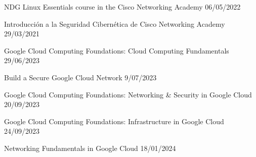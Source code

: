 NDG Linux Essentials course in the Cisco Networking Academy	\hfill 06/05/2022
 
Introducción a la Seguridad Cibernética de Cisco Networking Academy \hfill 29/03/2021


Google Cloud Computing Foundations: Cloud Computing Fundamentals \hfill 29/06/2023

Build a Secure Google Cloud Network \hfill 9/07/2023

Google Cloud Computing Foundations: Networking \& Security in Google Cloud \hfill 20/09/2023

Google Cloud Computing Foundations: Infrastructure in Google Cloud  \hfill 24/09/2023

Networking Fundamentals in Google Cloud \hfill 18/01/2024






